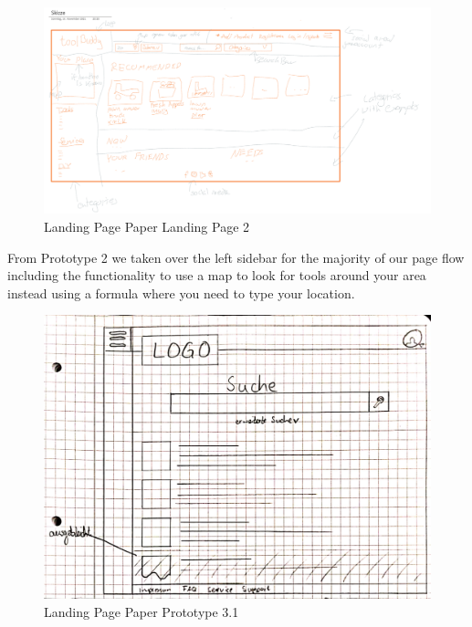 			
			 \begin{figure}[H]
				\centering
				\includegraphics[width=\linewidth]{src/abb/6_Sketching and Paper Prototyping/Homepage2.png}
				\caption{Landing Page Paper Landing Page 2}
				\label{fig:Homepage2}
			\end{figure}
			
			\noindent
			From Prototype 2 we taken over the left sidebar for the majority of our page flow including the functionality to use a map to look for tools around your area instead using a formula where you need to type your location.
			
			\begin{figure}[H]
				\centering
				\includegraphics[width=\linewidth]{src/abb/6_Sketching and Paper Prototyping/Homepage3.png}
				\caption{Landing Page Paper Prototype 3.1}
				\label{fig:Homepage3}
			\end{figure}
			
